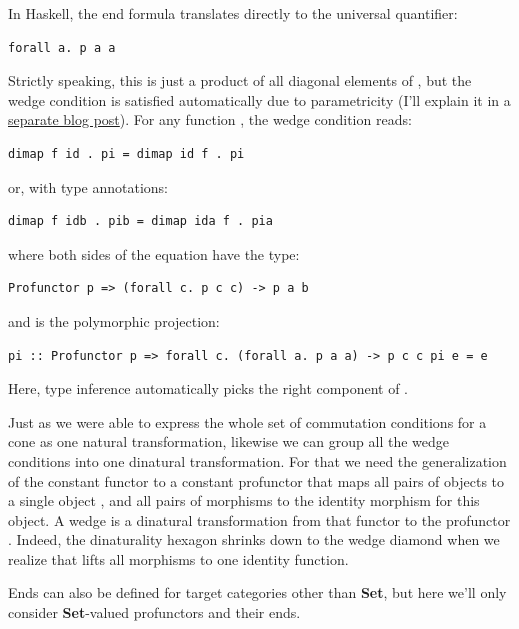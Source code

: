 In Haskell, the end formula translates directly to the universal
quantifier:

\begin{verbatim}
forall a. p a a
\end{verbatim}

Strictly speaking, this is just a product of all diagonal elements of
, but the wedge condition is satisfied automatically due to
parametricity (I'll explain it in a
\href{https://bartoszmilewski.com/2017/04/11/profunctor-parametricity/}{separate
blog post}). For any function , the
wedge condition reads:

\begin{verbatim}
dimap f id . pi = dimap id f . pi
\end{verbatim}

or, with type annotations:

\begin{verbatim}
dimap f idb . pib = dimap ida f . pia
\end{verbatim}

where both sides of the equation have the type:

\begin{verbatim}
Profunctor p => (forall c. p c c) -> p a b
\end{verbatim}

and  is the polymorphic projection:

\begin{verbatim}
pi :: Profunctor p => forall c. (forall a. p a a) -> p c c pi e = e
\end{verbatim}

Here, type inference automatically picks the right component of
.

Just as we were able to express the whole set of commutation conditions
for a cone as one natural transformation, likewise we can group all the
wedge conditions into one dinatural transformation. For that we need the
generalization of the constant functor  to a constant
profunctor that maps all pairs of objects to a single object ,
and all pairs of morphisms to the identity morphism for this object. A
wedge is a dinatural transformation from that functor to the profunctor
. Indeed, the dinaturality hexagon shrinks down to the wedge
diamond when we realize that  lifts all morphisms to one
identity function.

Ends can also be defined for target categories other than \textbf{Set},
but here we'll only consider \textbf{Set}-valued profunctors and their
ends.

